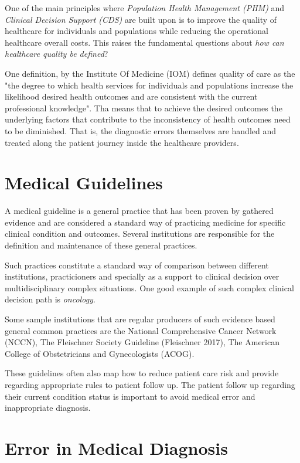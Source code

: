 \label{chap:introduction}

One of the main principles where \emph{Population Health Management (PHM)} and \emph{Clinical Decision Support (CDS)} are built upon is to improve the quality of healthcare for individuals and populations while reducing the operational healthcare overall costs. This raises the fundamental questions about \emph{how can healthcare quality be defined}?

One definition, by the Institute Of Medicine (IOM)\cite{iom2000} defines quality of care as the "the degree to which health services for individuals and populations increase the likelihood desired health outcomes and are consistent with the current professional knowledge". Tha means that to achieve the desired outcomes the underlying factors that contribute to the inconsistency of health outcomes need to be diminished. That is, the diagnostic errors themselves are handled and treated along the patient journey inside the healthcare providers.

\section{Medical Guidelines}

A medical guideline is a general practice that has been proven by gathered evidence and are considered a standard way of practicing medicine for specific clinical condition and outcomes. Several institutions are responsible for the definition and maintenance of these general practices. 

Such practices constitute a standard way of comparison between different institutions, practicioners and specially as a support to clinical decision over multidisciplinary complex situations. One good example of such complex clinical decision path is \emph{oncology}.

Some sample institutions that are regular producers of such evidence based general common practices are the National Comprehensive Cancer Network (NCCN)\cite{nccn2019}, The Fleischner Society Guideline (Fleischner 2017)\cite{fleischner2017}, The American College of Obstetricians and Gynecologists (ACOG)\cite{acog2019}.

These guidelines often also map how to reduce patient care risk and provide regarding appropriate rules to patient follow up. The patient follow up regarding their current condition status is important to avoid medical error and inappropriate diagnosis.

\section{Error in Medical Diagnosis}

